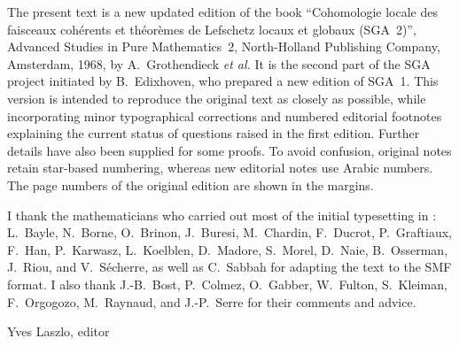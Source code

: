 \documentclass[11pt,a4paper,oneside]{book}
\begin{document}
The present text is a new updated edition of the book
``Cohomologie locale des faisceaux coh\'erents et th\'eor\`emes de Lefschetz
locaux et globaux (SGA~2)'', Advanced Studies in Pure Mathematics~2,
North-Holland Publishing Company, Amsterdam, 1968, by A.~Grothendieck
\emph{et al.} It is the second part of the SGA project initiated by
B.~Edixhoven, who prepared a new edition of SGA~1. This version is intended
to reproduce the original text as closely as possible, while incorporating
minor typographical corrections and numbered editorial footnotes explaining
the current status of questions raised in the first edition. Further details
have also been supplied for some proofs. To avoid confusion, original notes
retain star-based numbering, whereas new editorial notes use Arabic numbers.
The page numbers of the original edition are shown in the margins.

I thank the mathematicians who carried out most of the initial typesetting
in \LaTeXe: L.~Bayle, N.~Borne, O.~Brinon, J.~Buresi, M.~Chardin,
F.~Ducrot, P.~Graftiaux, F.~Han, P.~Karwasz, L.~Koelblen, D.~Madore,
S.~Morel, D.~Naie, B.~Osserman, J.~Riou, and V.~S\'echerre, as well as
C.~Sabbah for adapting the text to the SMF format. I also thank J.-B.~Bost,
P.~Colmez, O.~Gabber, W.~Fulton, S.~Kleiman, F.~Orgogozo, M.~Raynaud, and
J.-P.~Serre for their comments and advice.

\begin{flushright}
Yves Laszlo, editor
\end{flushright}

\cleardoublepage
\tableofcontents

\mainmatter















\end{document}
